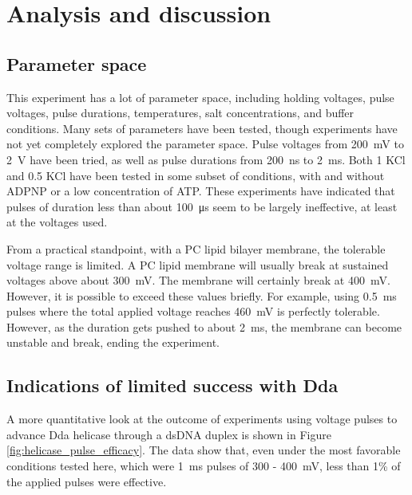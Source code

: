 \section{Analysis and discussion}

\subsection{Parameter space}

This experiment has a lot of parameter space, including holding voltages, pulse voltages, pulse durations, temperatures, salt concentrations, and buffer conditions.  Many sets of parameters have been tested, though experiments have not yet completely explored the parameter space.  Pulse voltages from \SI{200}{\mV} to \SI{2}{\V} have been tried, as well as pulse durations from \SI{200}{\ns} to \SI{2}{\ms}.  Both \SI{1}{\Molar} KCl and \SI{0.5}{\Molar} KCl have been tested in some subset of conditions, with and without ADPNP or a low concentration of ATP.  These experiments have indicated that pulses of duration less than about \SI{100}{\micro\s} seem to be largely ineffective, at least at the voltages used.

From a practical standpoint, with a PC lipid bilayer membrane, the tolerable voltage range is limited.  A PC lipid membrane will usually break at sustained voltages above about \SI{300}{\mV}.  The membrane will certainly break at \SI{400}{\mV}.  However, it is possible to exceed these values briefly.  For example, using \SI{0.5}{\ms} pulses where the total applied voltage reaches \SI{460}{\mV} is perfectly tolerable.  However, as the duration gets pushed to about \SI{2}{\ms}, the membrane can become unstable and break, ending the experiment.

\subsection{Indications of limited success with Dda}

A more quantitative look at the outcome of experiments using voltage pulses to advance Dda helicase through a dsDNA duplex is shown in Figure \ref{fig:helicase_pulse_efficacy}.  The data show that, even under the most favorable conditions tested here, which were \SI{1}{\ms} pulses of \num{300} - \SI{400}{\mV}, less than \num{1}\% of the applied pulses were effective.

